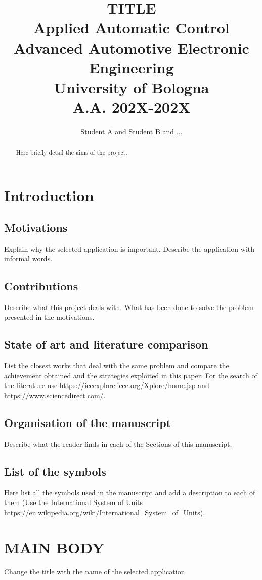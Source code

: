 \documentclass[]{report}
\title{{\huge  TITLE} \\
{\small Applied Automatic Control\\
Advanced Automotive Electronic Engineering\\
University of Bologna\\
A.A. 202X-202X}}
\author{Student A and Student B and ...}
\begin{document}
\maketitle

\begin{abstract}
	Here briefly detail  the aims of the project.
\end{abstract}

\chapter{Introduction}
\section{Motivations}
Explain why the selected application is important. Describe the application with informal words.

\section{Contributions}
Describe what this project deals with. What has been done to solve the problem presented in the motivations.

\section{State of art and literature comparison}
List the closest works that deal with the same problem and compare the achievement obtained and the strategies exploited in this paper. For the search of the literature use \url{https://ieeexplore.ieee.org/Xplore/home.jsp} and \url{https://www.sciencedirect.com/}.

\section{Organisation of the manuscript}
Describe what the reader finds in each of the Sections of this manuscript.

\section{List of the symbols}
Here list all the symbols used in the manuscript and add a description to each of them (Use the International System of Units \url{https://en.wikipedia.org/wiki/International_System_of_Units}).

\chapter{MAIN BODY}
Change the title with the name of the selected application
\end{document}
